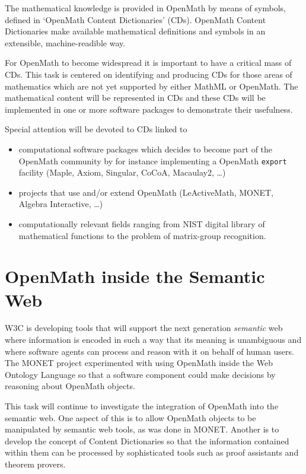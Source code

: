 \documentclass[draft]{artikel3}
\begin{document}
The mathematical knowledge is provided in OpenMath by means of
symbols, defined in `OpenMath Content Dictionaries' (CDs).  OpenMath
Content Dictionaries make available mathematical definitions and
symbols in an extensible, machine-readible way.

For OpenMath to become widespread it is important to have a critical
mass of CDs. This task is centered on identifying and producing CDs
for those areas of mathematics which are not yet supported by either
MathML or OpenMath. The mathematical content will be represented in
CDs and these CDs will be implemented in one or more software packages
to demonstrate their usefulness.

Special attention will be devoted to CDs linked to 
\begin{itemize}
  
\item computational software packages which decides to become part of
  the OpenMath community by for instance implementing a OpenMath
  \texttt{export} facility (Maple, Axiom, Singular, CoCoA, Macaulay2,
  \ldots)
  
\item projects that use and/or extend OpenMath (LeActiveMath, MONET,
  Algebra Interactive, \ldots)
  
\item computationally relevant fields ranging from NIST digital
  library of mathematical functions to the problem of matrix-group
  recognition.

\end{itemize}

\section{OpenMath inside the Semantic Web}

W3C is developing tools that will support the next generation
\emph{semantic} web where information is encoded in such a way that its
meaning is unambiguous and where software agents can process and reason
with it on behalf of human users.  The MONET project experimented with
using OpenMath inside the Web Ontology Language so that a software
component could make decisions by reasoning about OpenMath objects.

This task will continue to investigate the integration of OpenMath into
the semantic web.  One aspect of this is to allow OpenMath objects to be
manipulated by semantic web tools, as was done in MONET.  Another is to
develop the concept of Content Dictionaries so that the information
contained within them can be processed by sophisticated tools such as
proof assistants and theorem provers.
\end{document}
